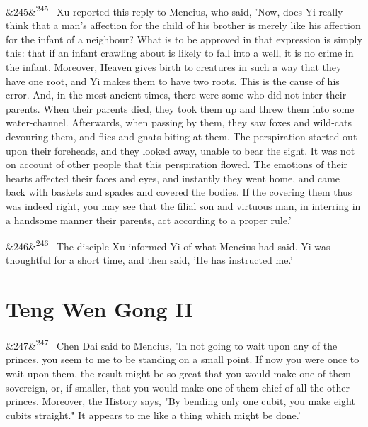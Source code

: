 \documentclass[12pt]{article}
\newcommand{\para}[1][]{\par\noindent\ifx&#1&\else\textsuperscript{\footnotesize #1}~\fi}
\begin{document}
\para[245] Xu reported this reply to Mencius, who said, 'Now, does Yi really think that a man's affection for the child of his brother is merely like his affection for the infant of a neighbour? What is to be approved in that expression is simply this: that if an infant crawling about is likely to fall into a well, it is no crime in the infant. Moreover, Heaven gives birth to creatures in such a way that they have one root, and Yi makes them to have two roots. This is the cause of his error. And, in the most ancient times, there were some who did not inter their parents. When their parents died, they took them up and threw them into some water-channel. Afterwards, when passing by them, they saw foxes and wild-cats devouring them, and flies and gnats biting at them. The perspiration started out upon their foreheads, and they looked away, unable to bear the sight. It was not on account of other people that this perspiration flowed. The emotions of their hearts affected their faces and eyes, and instantly they went home, and came back with baskets and spades and covered the bodies. If the covering them thus was indeed right, you may see that the filial son and virtuous man, in interring in a handsome manner their parents, act according to a proper rule.'

\para[246] The disciple Xu informed Yi of what Mencius had said. Yi was thoughtful for a short time, and then said, 'He has instructed me.'

\section*{Teng Wen Gong II}

\para[247] Chen Dai said to Mencius, 'In not going to wait upon any of the princes, you seem to me to be standing on a small point. If now you were once to wait upon them, the result might be so great that you would make one of them sovereign, or, if smaller, that you would make one of them chief of all the other princes. Moreover, the History says, "By bending only one cubit, you make eight cubits straight." It appears to me like a thing which might be done.'
\end{document}
